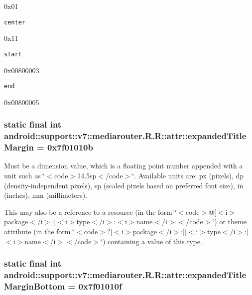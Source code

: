 0x01

{\tt center}

0x11

{\tt start}

0x00800003

{\tt end}

0x00800005\hypertarget{classandroid_1_1support_1_1v7_1_1mediarouter_1_1_r_1_1attr_c4a23dfe2a64dcd6c98ec0926a0c0994}{
\subsubsection[{expandedTitleMargin}]{\setlength{\rightskip}{0pt plus 5cm}static final int android::support::v7::mediarouter.R.R::attr::expandedTitleMargin = 0x7f01010b}}
\label{classandroid_1_1support_1_1v7_1_1mediarouter_1_1_r_1_1attr_c4a23dfe2a64dcd6c98ec0926a0c0994}


Must be a dimension value, which is a floating point number appended with a unit such as \char`\"{}$<$code$>$14.5sp$<$/code$>$\char`\"{}. Available units are: px (pixels), dp (density-independent pixels), sp (scaled pixels based on preferred font size), in (inches), mm (millimeters). 

This may also be a reference to a resource (in the form \char`\"{}$<$code$>$@\mbox{[}$<$i$>$package$<$/i$>$:\mbox{]}$<$i$>$type$<$/i$>$:$<$i$>$name$<$/i$>$$<$/code$>$\char`\"{}) or theme attribute (in the form \char`\"{}$<$code$>$?\mbox{[}$<$i$>$package$<$/i$>$:\mbox{]}\mbox{[}$<$i$>$type$<$/i$>$:\mbox{]}$<$i$>$name$<$/i$>$$<$/code$>$\char`\"{}) containing a value of this type. \hypertarget{classandroid_1_1support_1_1v7_1_1mediarouter_1_1_r_1_1attr_e212d2ed2da76cc6d8b598b715aa3daa}{
\subsubsection[{expandedTitleMarginBottom}]{\setlength{\rightskip}{0pt plus 5cm}static final int android::support::v7::mediarouter.R.R::attr::expandedTitleMarginBottom = 0x7f01010f}}
\label{classandroid_1_1support_1_1v7_1_1mediarouter_1_1_r_1_1attr_e212d2ed2da76cc6d8b598b715aa3daa}


